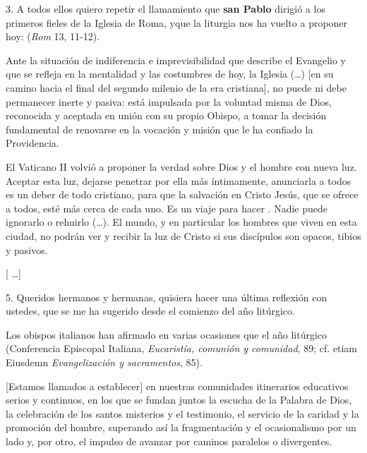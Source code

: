 \begin{body}
				3. A todos ellos quiero repetir el llamamiento que \textbf{san Pablo} dirigió a los primeros fieles de la Iglesia de Roma, y ​​que la liturgia nos ha vuelto a proponer hoy:  (\emph{Rom} 13, 11-12). 
				
				Ante la situación de indiferencia e imprevisibilidad que describe el Evangelio y que se refleja en la mentalidad y las costumbres de hoy, la Iglesia (\ldots{}) {[}en su camino hacia el final del segundo milenio de la era cristiana{]}, no puede ni debe permanecer inerte y pasiva: está impulsada por la voluntad misma de Dios, reconocida y aceptada en unión con su propio Obispo, a tomar la decisión fundamental de renovarse en la vocación y misión que le ha confiado la Providencia. 
				
				El Vaticano II volvió a proponer la verdad sobre Dios y el hombre con nueva luz. Aceptar esta luz, dejarse penetrar por ella más íntimamente, anunciarla a todos es un deber de todo cristiano, para que la salvación en Cristo Jesús, que se ofrece a todos, esté más cerca de cada uno. Es un viaje para hacer . Nadie puede ignorarlo o rehuirlo (\ldots{}). El mundo, y en particular los hombres que viven en esta ciudad, no podrán ver y recibir la luz de Cristo si sus discípulos son opacos, tibios y pasivos. 
				
				{[} \ldots{}{]} 
				
				5. Queridos hermanos y hermanas, quisiera hacer una última reflexión con ustedes, que se me ha sugerido desde el comienzo del año litúrgico.  
				
				Los obispos italianos han afirmado en varias ocasiones que el año litúrgico  (Conferencia Episcopal Italiana, \emph{Eucaristía, comunión y comunidad}, 89; cf. etiam Eiusdemn \emph{Evangelización y sacramentos}, 85). 
				
				{[}Estamos llamados a establecer{]} en nuestras comunidades itinerarios educativos serios y continuos, en los que se fundan juntos la escucha de la Palabra de Dios, la celebración de los santos misterios y el testimonio, el servicio de la caridad y la promoción del hombre, superando así la fragmentación y el ocasionalismo por un lado y, por otro, el impulso de avanzar por caminos paralelos o divergentes. 
				

\end{body}
